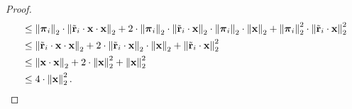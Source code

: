 \documentclass[10pt]{article}
\def\rvx{{\mathbf{x}}}
\def\rvtilder{{\tilde{\mathbf{r}}}}
\def\rvpi{{\boldsymbol{\pi}}}
\begin{document}
\begin{proof}
\begin{equation*}
\begin{split}
    &\le \left\| \rvpi_i \right\|_2 \cdot \left\| \rvtilder_i \cdot \rvx \cdot \rvx \right\|_2 + 2 \cdot \left\| \rvpi_i \right\|_2 \cdot \left\| \rvtilder_i \cdot \rvx \right\|_2 \cdot \left\| \rvpi_i \right\|_2 \cdot \left\| \rvx \right\|_2 + \left\| \rvpi_i \right\|_2^2 \cdot \left\| \rvtilder_i \cdot \rvx \right\|_2^2 \\
    &\le \left\| \rvtilder_i \cdot \rvx \cdot \rvx \right\|_2 + 2 \cdot \left\| \rvtilder_i \cdot \rvx \right\|_2 \cdot \left\| \rvx \right\|_2 + \left\| \rvtilder_i \cdot \rvx \right\|_2^2 \\
    &\le \left\| \rvx \cdot \rvx \right\|_2 + 2 \cdot \left\| \rvx \right\|_2^2 + \left\| \rvx \right\|_2^2 \\
    &\le 4 \cdot \left\| \rvx \right\|_2^2. \qedhere
\end{split}
\end{equation*}
\end{proof}
\end{document}
